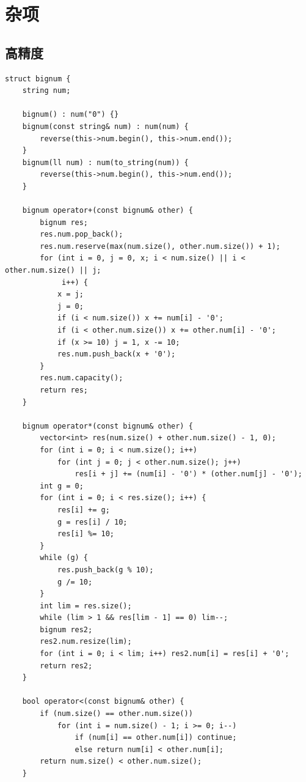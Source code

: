 \documentclass[UTF8]{ctexart}
\begin{document}
\begin{sloppypar}
\clearpage

\section{杂项}

\subsection{高精度}

\begin{lstlisting}[style=cpp]
struct bignum {
    string num;

    bignum() : num("0") {}
    bignum(const string& num) : num(num) {
        reverse(this->num.begin(), this->num.end());
    }
    bignum(ll num) : num(to_string(num)) {
        reverse(this->num.begin(), this->num.end());
    }

    bignum operator+(const bignum& other) {
        bignum res;
        res.num.pop_back();
        res.num.reserve(max(num.size(), other.num.size()) + 1);
        for (int i = 0, j = 0, x; i < num.size() || i < other.num.size() || j;
             i++) {
            x = j;
            j = 0;
            if (i < num.size()) x += num[i] - '0';
            if (i < other.num.size()) x += other.num[i] - '0';
            if (x >= 10) j = 1, x -= 10;
            res.num.push_back(x + '0');
        }
        res.num.capacity();
        return res;
    }

    bignum operator*(const bignum& other) {
        vector<int> res(num.size() + other.num.size() - 1, 0);
        for (int i = 0; i < num.size(); i++)
            for (int j = 0; j < other.num.size(); j++)
                res[i + j] += (num[i] - '0') * (other.num[j] - '0');
        int g = 0;
        for (int i = 0; i < res.size(); i++) {
            res[i] += g;
            g = res[i] / 10;
            res[i] %= 10;
        }
        while (g) {
            res.push_back(g % 10);
            g /= 10;
        }
        int lim = res.size();
        while (lim > 1 && res[lim - 1] == 0) lim--;
        bignum res2;
        res2.num.resize(lim);
        for (int i = 0; i < lim; i++) res2.num[i] = res[i] + '0';
        return res2;
    }

    bool operator<(const bignum& other) {
        if (num.size() == other.num.size())
            for (int i = num.size() - 1; i >= 0; i--)
                if (num[i] == other.num[i]) continue;
                else return num[i] < other.num[i];
        return num.size() < other.num.size();
    }


\end{lstlisting}
\end{sloppypar}
\end{document}
